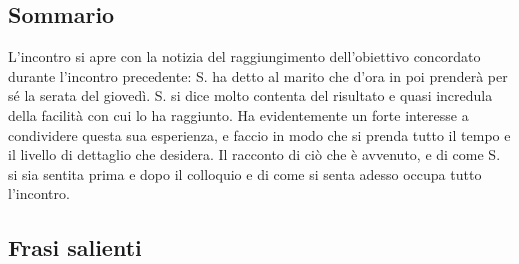 \subsection*{Sommario}
 
L'incontro si apre con la notizia del raggiungimento dell'obiettivo concordato durante l'incontro precedente: S. ha detto al marito che d'ora in poi prenderà per sé la serata del giovedì. S. si dice molto contenta del risultato e quasi incredula della facilità con cui lo ha raggiunto. Ha evidentemente un forte interesse a condividere questa sua esperienza, e faccio in modo che si prenda tutto il tempo e il livello di dettaglio che desidera.
Il racconto di ciò che è avvenuto, e di come S. si sia sentita prima e dopo il colloquio e di come si senta adesso occupa tutto l'incontro.

\subsection*{Frasi salienti}


